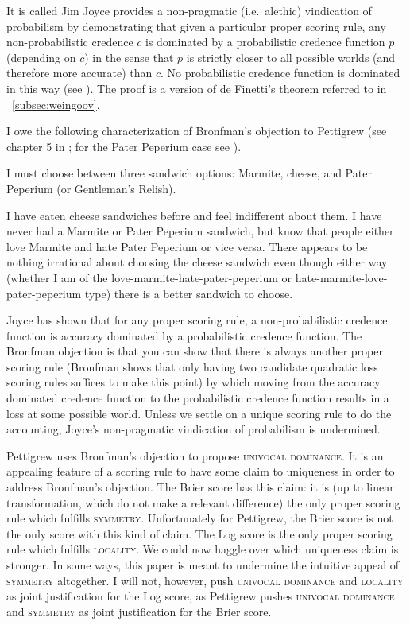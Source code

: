 \documentclass[12pt]{article}
\begin{document}
It is called  Jim
Joyce provides a non-pragmatic (i.e.\ alethic) vindication of
probabilism by demonstrating that given a particular proper scoring
rule, any non-probabilistic credence $c$ is dominated by a
probabilistic credence function $p$ (depending on $c$) in the sense
that $p$ is strictly closer to all possible worlds (and therefore more
accurate) than $c$. No probabilistic credence function is dominated in
this way (see ). The proof is a version of de
Finetti's theorem referred to in {\ubsection}~\ref{subsec:weingoov}.

I owe the following characterization of Bronfman's objection to
Pettigrew (see chapter 5 in ; for the Pater
Peperium case see ).

\begin{quotex}
  \label{ex:quuyaree} I must choose between
  three sandwich options: Marmite, cheese, and Pater Peperium (or
  Gentleman's Relish).
\end{quotex}

I have eaten cheese sandwiches before and feel indifferent about them.
I have never had a Marmite or Pater Peperium sandwich, but know that
people either love Marmite and hate Pater Peperium or vice versa.
There appears to be nothing irrational about choosing the cheese
sandwich even though either way (whether I am of the
love-marmite-hate-pater-peperium or hate-marmite-love-pater-peperium
type) there is a better sandwich to choose. 

Joyce has shown that for any proper scoring rule, a non-probabilistic
credence function is accuracy dominated by a probabilistic credence
function. The Bronfman objection is that you can show that there is
always another proper scoring rule (Bronfman shows that only having
two candidate quadratic loss scoring rules suffices to make this
point) by which moving from the accuracy dominated credence function
to the probabilistic credence function results in a loss at some
possible world. Unless we settle on a unique scoring rule to do the
accounting, Joyce's non-pragmatic vindication of probabilism is
undermined. 

Pettigrew uses Bronfman's objection to propose \textsc{univocal
  dominance}. It is an appealing feature of a scoring rule to have
some claim to uniqueness in order to address Bronfman's objection. The
Brier score has this claim: it is (up to linear transformation, which
do not make a relevant difference) the only proper scoring rule which
fulfills \textsc{symmetry}. Unfortunately for Pettigrew, the Brier
score is not the only score with this kind of claim. The Log score is
the only proper scoring rule which fulfills \textsc{locality}. We
could now haggle over which uniqueness claim is stronger. In some
ways, this paper is meant to undermine the intuitive appeal of
\textsc{symmetry} altogether. I will not, however, push
\textsc{univocal dominance} and \textsc{locality} as joint
justification for the Log score, as Pettigrew pushes \textsc{univocal
  dominance} and \textsc{symmetry} as joint justification for the
Brier score. 
\end{document}
